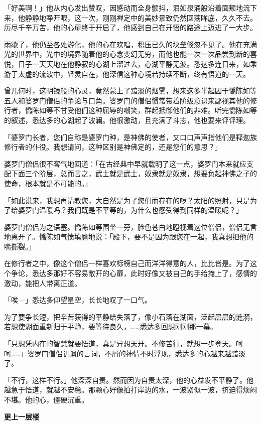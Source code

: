 \documentclass[12pt,twoside,openany]{book}
\newcommand{\mt}[1]{\textbullet \textbf{#1}}
\begin{document}
「好美啊！」他从内心发出赞叹，因感动而全身颤抖，泪如泉涌般沿着面颊地流下来，他静静地睁开眼，这一次，刚刚禅定中的美妙景致仍然回荡眸底，久久不去。历尽千辛万苦，他的心扉终于开启了，他感到自己在开悟的路途上迈进了一大步。

雨歇了，他仍至各处游化，他的心在欢唱，积压已久的块垒倏忽不见了。他在充满光的世界中，光中的境界随着他的心念变幻无穷，而他也能一次一次品尝到新的喜悦，日子一天天地在他静寂的心湖上溜过去，心湖平静无波。悉达多连日来，如乘游于太虚的流波中，轻灵自在，他深信这种心境若持续不断，终有悟道的一天。

曾几何时，这明镜般的心灵，竟然蒙上了黯淡的烟雾，想来这多半起因于憍陈如等五人和婆罗门僧侣的争论与口角。婆罗门的僧侣惯常带着阶级意识来鄙视其他的修行者，憍陈如等不甘受他们这种屈辱的嘲笑，群起抵御他们的非难。听完憍陈如等的叙述，悉达多的心湖起了波澜。他很激动，且充满了斗志，他也要来评评理。

「婆罗门长者，您们自称是婆罗门种，是神佛的使者，又口口声声指他们是释迦族修行者的仆役。我想请问，这种区别是神佛定的，还是您们的意思？」

婆罗门僧侣很不客气地回道：「在古经典中早就载明了这一点，婆罗门本来就应支配下面三个阶层，总而言之，武士就是武士，奴隶就是奴隶，想要负起神佛之子的使命，根本就是不可能的。」

「如此说来，我想再请教您，大自然是为了您们而存在的啰？太阳的照射，只是为了给婆罗门温暖吗？我们既是不平等的，为什么也感受得到同样的温暖呢？」

婆罗门僧侣为之语塞。憍陈如等围坐一旁，脸色苍白地瞪视着这位僧侣，僧侣无言地离开了。憍陈如气愤填膺地说：「殿下，要不是因为跟您在一起，我真想把他的嘴撕裂。」

在修行者之中，像这个僧侣一样喜欢标榜自己而洋洋得意的人，比比皆是。为了这个争论，悉达多那好不容易敞开的心扉，此时好像又被自己的手给掩上了，感情的激动，能把人带离正道。

「唉---」悉达多仰望星空，长长地叹了一口气。

为了要争长短，把辛苦获得的平静给失落了，像小石落在湖面，泛起层层的涟漪，若想使湖面重新归于平静，要等待良久，……悉达多回想刚刚那一幕。

「只想凭内在的智慧就要悟道，真是异想天开。不修苦行，就想一步登天。呵呵……」婆罗门僧侣讥讽的言词，不屑的神情不时浮现，悉达多的心越来越黯淡了。

「不行，这样不行。」他深深自责。然而因为自责太深，他的心益发不平静了。他越急于悟道，就越不安稳。那颗心好像拍打岸边的水，一波紧似一波，挤迫得烦闷不堪。他的心，僵硬沉重。

\mt{更上一层楼}
\end{document}
